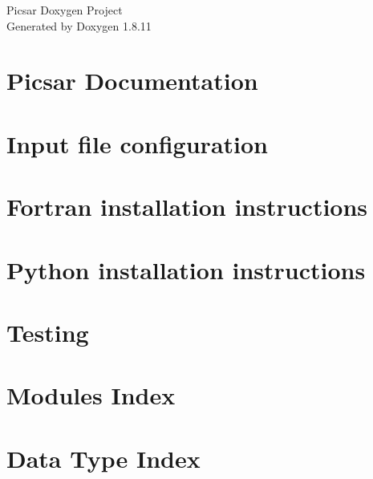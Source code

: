 \documentclass[twoside]{book}
\newcommand{\+}{\discretionary{\mbox{\scriptsize$\hookleftarrow$}}{}{}}
\newcommand{\clearemptydoublepage}{%
  \newpage{\pagestyle{empty}\cleardoublepage}%
}
\begin{document}
\hypersetup{pageanchor=false,
             bookmarksnumbered=true,
             pdfencoding=unicode
            }
\begin{titlepage}
\vspace*{7cm}
\begin{center}%
{\Large Picsar Doxygen Project }\\
\vspace*{1cm}
{\large Generated by Doxygen 1.8.11}\\
\end{center}
\end{titlepage}
\clearemptydoublepage
\tableofcontents
\clearemptydoublepage
{}
\hypersetup{pageanchor=true}

\chapter{Picsar Documentation}
\label{index}\hypertarget{index}{}
\chapter{Input file configuration}
\label{Input file configuration}
\hypertarget{Input file configuration}{}

\chapter{Fortran installation instructions}
\label{Fortran installation instructions}
\hypertarget{Fortran installation instructions}{}

\chapter{Python installation instructions}
\label{Python installation instructions}
\hypertarget{Python installation instructions}{}

\chapter{Testing}
\label{Testing}
\hypertarget{Testing}{}

\chapter{Modules Index}

\chapter{Data Type Index}

\end{document}
